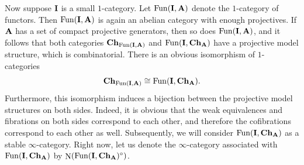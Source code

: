 \documentclass[psamsfonts]{amsart}
\theoremstyle{plain}
\theoremstyle{definition}
\theoremstyle{remark}
\newcommand{\catname}[1]{{\normalfont\textbf{#1}}}
\newcommand{\ch}{\catname{Ch}}
\DeclareMathOperator{\ext}{Ext}
\DeclareMathOperator{\map}{Map}
\DeclareMathOperator{\spectralmaps}{\underline{\underline{\map}}}
\DeclareMathOperator{\Nerve}{N}
\DeclareMathOperator{\fun}{Fun}
\begin{document}
Now suppose $\catname{I}$ is a small $1$-category. Let $\fun(\catname{I}, \catname{A})$ denote the $1$-category of functors. Then $\fun(\catname{I}, \catname{A})$ is again an abelian category with enough projectives. If $\catname{A}$ has a set of compact projective generators, then so does $\fun(\catname{I}, \catname{A})$, and it follows that both categories $\ch_{\fun(\catname{I}, \catname{A})}$ and $\fun(\catname{I}, \ch_{\catname{A}})$ have a projective model structure, which is combinatorial. There is an obvious isomorphism of $1$-categories 
\begin{equation}\label{eq: complexes of functors}
\ch_{\fun(\catname{I}, \catname{A})}\cong \fun(\catname{I}, \ch_{\catname{A}}).
\end{equation}
Furthermore, this isomorphism induces a bijection between the projective model structures on both sides. Indeed, it is obvious that the weak equivalences and fibrations on both sides correspond to each other, and therefore the cofibrations correspond to each other as well. Subsequently, we will consider $\fun(\catname{I}, \ch_{\catname{A}})$ as a stable $\infty$-category. Right now, let us denote the $\infty$-category associated with $\fun(\catname{I}, \ch_{\catname{A}})$ by $\Nerve(\fun(\catname{I}, \ch_{\catname{A}})^{\circ})$. 
\end{document}
